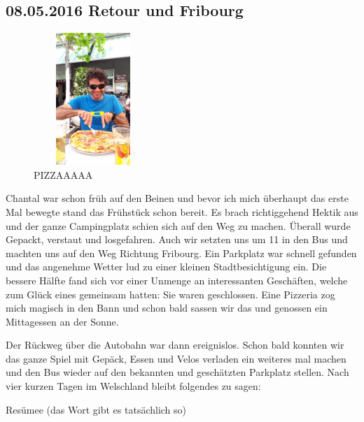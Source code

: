 \subsection{08.05.2016 Retour und Fribourg}

\begin{figure} 
  \begin{centering}
    \includegraphics[width=0.4\textwidth, height=5cm, keepaspectratio]{../Bilder/Gruyere/26.jpg}
    \caption{PIZZAAAAA}
  \end{centering}
\end{figure} 

Chantal war schon früh auf den Beinen und bevor ich mich überhaupt das erste Mal bewegte stand das Frühstück schon bereit.
Es brach richtiggehend Hektik aus und der ganze Campingplatz schien sich auf den Weg zu machen.
Überall wurde Gepackt, verstaut und losgefahren.
Auch wir setzten uns um 11 in den Bus und machten uns auf den Weg Richtung Fribourg.
Ein Parkplatz war schnell gefunden und das angenehme Wetter lud zu einer kleinen Stadtbesichtigung ein.
Die bessere Hälfte fand sich vor einer Unmenge an interessanten Geschäften, welche zum Glück eines gemeinsam hatten: Sie waren geschlossen.
Eine Pizzeria zog mich magisch in den Bann und schon bald sassen wir das und genossen ein Mittagessen an der Sonne.

Der Rückweg über die Autobahn war dann ereignislos.
Schon bald konnten wir das ganze Spiel mit Gepäck, Essen und Velos verladen ein weiteres mal machen und den Bus wieder auf den bekannten und geschätzten Parkplatz stellen.
Nach vier kurzen Tagen im Welschland bleibt folgendes zu sagen:

Resümee (das Wort gibt es tatsächlich so) 

